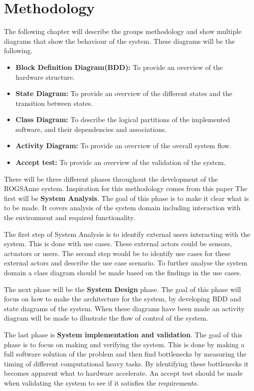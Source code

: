 
\chapter{Methodology}
The following chapter will describe the groups methodology and show multiple diagrams that show the behaviour of the system. These diagrams will be the following.

\begin{itemize}
	\item\textbf{Block Definition Diagram(BDD):} To provide an overview of the hardware structure.
	
	\item \textbf{State Diagram:} To provide an overview of the different states and the transition between states.
	
	\item \textbf{Class Diagram:} To describe the logical partitions of the implemented software, and their dependencies and associations.
	
	\item \textbf{Activity Diagram:} To provide an overview of the overall system flow.
	
	\item \textbf{Accept test:} To provide an overview of the validation of the system.
\end{itemize}

There will be three different phases throughout the development of the ROGSAnne system. Inspiration for this methodology comes from this paper \cite{A_HW_SW_CodesignMethodology} The first will be \textbf{System Analysis}. The goal of this phase is to make it clear what is to be made. It covers analysis of the system domain including interaction with the environment and required functionality.

The first step of System Analysis is to identify external users interacting with the system. This is done with use cases. These external actors could be sensors, actuators or users. The second step would be to identify use cases for these external actors and describe the use case scenario. 
To further analyse the system domain a class diagram should be made based on the findings in the use cases.

The next phase will be the \textbf{System Design} phase. The goal of this phase will focus on how to make the architecture for the system, by developing BDD and state diagrams of the system. When these diagrams have been made an activity diagram will be made to illustrate the flow of control of the system.

The last phase is \textbf{System implementation and validation}. The goal of this phase is to focus on making and verifying the system. This is done by making a full software solution of the problem and then find bottlenecks by measuring the timing of different computational heavy tasks. By identifying these bottlenecks it becomes apparent what to hardware accelerate. 
An accept test should be made when validating the system to see if it satisfies the requirements.